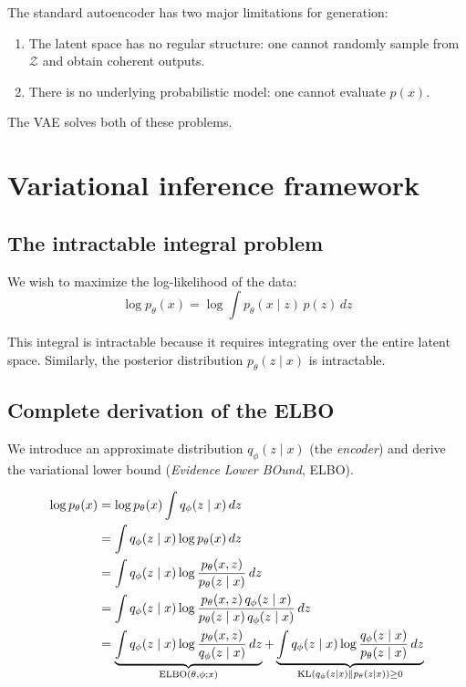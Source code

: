 \begin{warning}
The standard autoencoder has two major limitations for generation:
\begin{enumerate}
    \item The latent space has no regular structure: one cannot randomly sample from $\mathcal{Z}$ and obtain coherent outputs.
    \item There is no underlying probabilistic model: one cannot evaluate $p(x)$.
\end{enumerate}
The VAE solves both of these problems.
\end{warning}

\section{Variational inference framework}
\label{sec:variational-inference}

\subsection{The intractable integral problem}

We wish to maximize the log-likelihood of the data:
\begin{equation}
\log p_\theta(x) = \log \int p_\theta(x \mid z)\, p(z)\, dz
\end{equation}

This integral is intractable because it requires integrating over the entire latent space. Similarly, the posterior distribution $p_\theta(z \mid x)$ is intractable.

\subsection{Complete derivation of the ELBO}

We introduce an approximate distribution $q_\phi(z \mid x)$ (the \emph{encoder}) and derive the variational lower bound (\emph{Evidence Lower BOund}, ELBO).

\begin{theorem}
\label{thm:elbo-kl}
\begin{align}
\log p_\theta(x) &= \log p_\theta(x) \int q_\phi(z \mid x)\, dz \label{eq:elbo-start}\\
&= \int q_\phi(z \mid x) \log p_\theta(x)\, dz \\
&= \int q_\phi(z \mid x) \log \frac{p_\theta(x, z)}{p_\theta(z \mid x)}\, dz \\
&= \int q_\phi(z \mid x) \log \frac{p_\theta(x, z)\, q_\phi(z \mid x)}{p_\theta(z \mid x)\, q_\phi(z \mid x)}\, dz \\
&= \underbrace{\int q_\phi(z \mid x) \log \frac{p_\theta(x, z)}{q_\phi(z \mid x)}\, dz}_{\text{ELBO}(\theta, \phi; x)} + \underbrace{\int q_\phi(z \mid x) \log \frac{q_\phi(z \mid x)}{p_\theta(z \mid x)}\, dz}_{\mathrm{KL}(q_\phi(z|x) \| p_\theta(z|x)) \geq 0}
\end{align}
\end{theorem}

